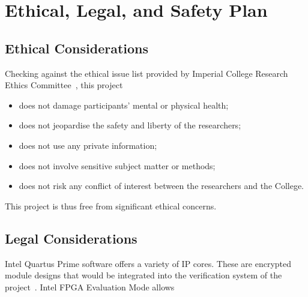 \documentclass[journal]{IEEEtran}
\begin{document}
\section{Ethical, Legal, and Safety Plan}

\subsection{Ethical Considerations}

Checking against the ethical issue list provided by Imperial College Research
Ethics Committee~\cite{Imperial1}, this project
\begin{itemize}
  \item does not damage participants' mental or physical health;
  \item does not jeopardise the safety and liberty of the researchers;
  \item does not use any private information;
  \item does not involve sensitive subject matter or methods;
  \item does not risk any conflict of interest between the researchers and
        the College.
\end{itemize}
This project is thus free from significant ethical concerns.

\subsection{Legal Considerations}
Intel Quartus Prime software offers a variety of IP cores.
These are encrypted module designs that would be integrated into the
verification system of the project~\cite{Intel2}.
Intel FPGA Evaluation Mode allows
\end{document}
